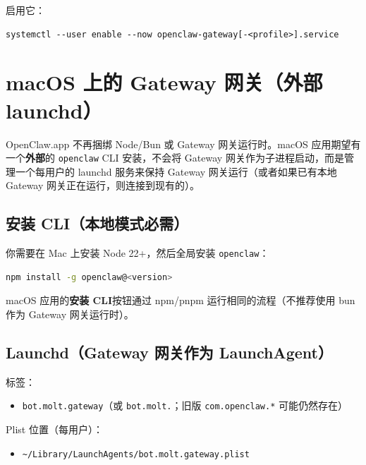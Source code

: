 启用它：

\begin{lstlisting}
systemctl --user enable --now openclaw-gateway[-<profile>].service
\end{lstlisting}



\clearpage

\section{macOS 上的 Gateway 网关（外部 launchd）}


OpenClaw.app 不再捆绑 Node/Bun 或 Gateway 网关运行时。macOS 应用期望有一个\textbf{外部}的 \texttt{openclaw} CLI 安装，不会将 Gateway 网关作为子进程启动，而是管理一个每用户的 launchd 服务来保持 Gateway 网关运行（或者如果已有本地 Gateway 网关正在运行，则连接到现有的）。

\subsection{安装 CLI（本地模式必需）}


你需要在 Mac 上安装 Node 22+，然后全局安装 \texttt{openclaw}：

\begin{lstlisting}[language=bash]
npm install -g openclaw@<version>
\end{lstlisting}


macOS 应用的\textbf{安装 CLI}按钮通过 npm/pnpm 运行相同的流程（不推荐使用 bun 作为 Gateway 网关运行时）。

\subsection{Launchd（Gateway 网关作为 LaunchAgent）}


标签：

\begin{itemize}
  \item \texttt{bot.molt.gateway}（或 \texttt{bot.molt.}；旧版 \texttt{com.openclaw.*} 可能仍然存在）
\end{itemize}


Plist 位置（每用户）：

\begin{itemize}
  \item \texttt{\textasciitilde{}/Library/LaunchAgents/bot.molt.gateway.plist}
\end{itemize}

